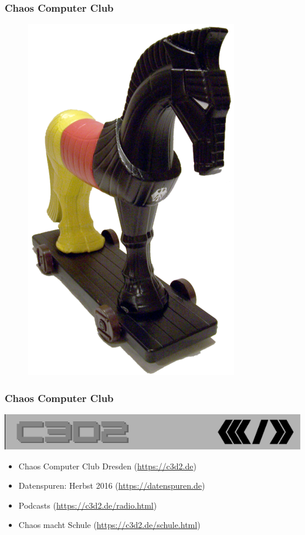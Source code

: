 \documentclass[12pt]{beamer}
\begin{document}
\begin{frame}
  \frametitle{Chaos Computer Club}
  \begin{figure}
    \includegraphics[height=0.7\textheight]{img/trojaner.png}
  \end{figure}
\end{frame}

\begin{frame}
    \frametitle{Chaos Computer Club}
    \begin{center}
	\includegraphics[height=0.1\textheight]{img/c3d2_logo.png}
    \end{center}
    \begin{itemize}
      \item<1-> Chaos Computer Club Dresden (\url{https://c3d2.de})
      \item<2-> Datenspuren: Herbst 2016 (\url{https://datenspuren.de})
      \item<3-> Podcasts (\url{https://c3d2.de/radio.html})
      \item<4-> Chaos macht Schule (\url{https://c3d2.de/schule.html})
    \end{itemize}
\end{frame}
\end{document}

